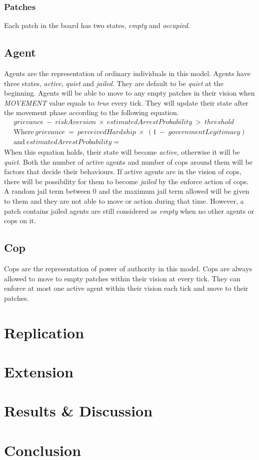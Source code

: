 \documentclass[11pt]{article}
\begin{document}
        \subsubsection{Patches}
        Each patch in the board has two states, \textit{empty} and \textit{occupied}.
        \subsection{Agent}
        Agents are the representation of ordinary individuals in this model. Agents
        have three states, \textit{active}, \textit{quiet} and \textit{jailed}. 
        They are default to be \textit{quiet} at the beginning. Agents will be able
        to move to any empty patches in their vision when \textit{MOVEMENT} value
        equals to \textit{true} every tick. They will update their state after the
        movement phase according to the following equation.
        \begin{equation}
            \begin{split}
                grievance\:-\:riskAversion\:\times\:estimatedArrestProbability\:>\:threshold \\
                \text{Where}\ grievance\:=\:perceivedHardship\:\times\:(1\:-\:governmentLegitimacy)\\
                \text{and}\ estimatedArrestProbability = 
            \end{split}
        \end{equation}  
        When this equation holds, their state will become \textit{active}, otherwise
        it will be \textit{quiet}. Both the number of active agents and number of
        cops around them will be factors that decide their behaviours.
        If active agents are in the vision of cops, there
        will be possibility for them to become \textit{jailed} by the enforce action
        of cops. A random jail term between 0 and the maximum jail term allowed will
        be given to them and they are not able to move or action during that time.
        However, a patch contains jailed agents are still considered as \textit{empty}
        when no other agents or cops on it.
        \subsection{Cop}
        Cops are the representation of power of authority in this model. Cops
        are always allowed to move to empty patches within their vision at 
        every tick. They can enforce at most one active agent within their vision
        each tick and move to their patches.
        
    \section{Replication}
        
    \section{Extension}
    \section{Results \& Discussion}
    \section{Conclusion}
\end{document}
